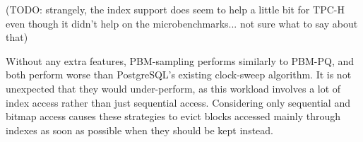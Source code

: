 (TODO: strangely, the index support does seem to help a little bit for TPC-H even though it didn't help on the microbenchmarks... not sure what to say about that)

Without any extra features, PBM-sampling performs similarly to PBM-PQ, and both perform worse than PostgreSQL's existing clock-sweep algorithm. It is not unexpected that they would under-perform, as this workload involves a lot of index access rather than just sequential access. Considering only sequential and bitmap access causes these strategies to evict blocks accessed mainly through indexes as soon as possible when they should be kept instead.




